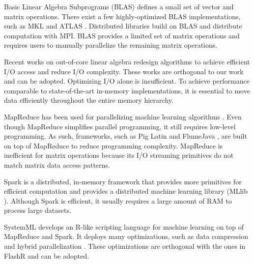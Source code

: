 Basic Linear Algebra Subprograms (BLAS) defines a small set of vector and
matrix operations. There exist a few highly-optimized BLAS implementations,
such as MKL \cite{mkl} and ATLAS \cite{atlas}. 
Distributed libraries \cite{trilinos, petsc, elemental}
build on BLAS and distribute computation with MPI.
BLAS provides a limited set of matrix operations and requires
users to manually parallelize the remaining matrix operations.

Recent works on out-of-core linear algebra \cite{Toledo99, Quintana-Orti12}
redesign algorithms to achieve efficient I/O access and reduce I/O
complexity. These works are orthogonal to our work and can be adopted.
Optimizing I/O
alone is insufficient. To achieve performance comparable to state-of-the-art
in-memory implementations, it is essential to move data efficiently throughout
the entire memory hierarchy.

MapReduce \cite{mapreduce} has been used for parallelizing machine learning
algorithms \cite{Chu06}. Even though MapReduce simplifies parallel programming,
it still requires low-level programming. As such, frameworks, such as Pig Latin
\cite{pig} and FlumeJava \cite{flumejava}, are built on top
of MapReduce to reduce programming complexity. MapReduce is inefficient for
matrix operations because
its I/O streaming primitives do not match matrix data access patterns.

Spark \cite{spark} is a distributed, in-memory framework that provides more
primitives for efficient computation and provides a distributed machine
learning library (MLlib \cite{mllib}). Although Spark is efficient, it usually
requires a large amount of RAM to process large datasets.

SystemML \cite{systemml, systemml2} develops an R-like scripting language for
machine learning on top of MapReduce and Spark. It deploys many optimizations,
such as data compression \cite{Elgohary16} and hybrid parallelization
\cite{Boehm14}. These optimizations are orthogonal with the ones in FlashR
and can be adopted.


